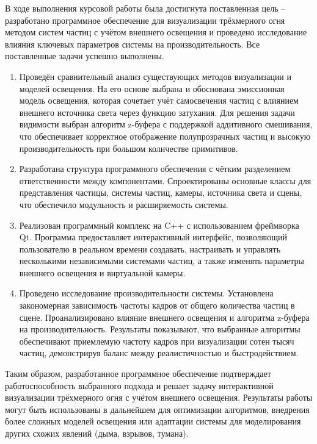 
В ходе выполнения курсовой работы была достигнута поставленная цель -- разработано программное обеспечение для визуализации трёхмерного огня методом систем частиц с учётом внешнего освещения и проведено исследование влияния ключевых параметров системы на производительность. Все поставленные задачи успешно выполнены.

\begin{enumerate}
	\item Проведён сравнительный анализ существующих методов визуализации и моделей освещения. На его основе выбрана и обоснована эмиссионная модель освещения, которая сочетает учёт самосвечения частиц с влиянием внешнего источника света через функцию затухания. Для решения задачи видимости выбран алгоритм z-буфера с поддержкой аддитивного смешивания, что обеспечивает корректное отображение полупрозрачных частиц и высокую производительность при большом количестве примитивов.
	
	\item Разработана структура программного обеспечения с чётким разделением ответственности между компонентами. Спроектированы основные классы для представления частицы, системы частиц, камеры, источника света и сцены, что обеспечило модульность и расширяемость системы.
	
	\item Реализован программный комплекс на C++ с использованием фреймворка Qt. Программа предоставляет интерактивный интерфейс, позволяющий пользователю в реальном времени создавать, настраивать и управлять несколькими независимыми системами частиц, а также изменять параметры внешнего освещения и виртуальной камеры.
	
	\item Проведено исследование производительности системы. Установлена закономерная зависимость частоты кадров от общего количества частиц в сцене. Проанализировано влияние внешнего освещения и алгоритма z-буфера на производительность. Результаты показывают, что выбранные алгоритмы обеспечивают приемлемую частоту кадров при визуализации сотен тысяч частиц, демонстрируя баланс между реалистичностью и быстродействием.
\end{enumerate}

Таким образом, разработанное программное обеспечение подтверждает работоспособность выбранного подхода и решает задачу интерактивной визуализации трёхмерного огня с учётом внешнего освещения. Результаты работы могут быть использованы в дальнейшем для оптимизации алгоритмов, внедрения более сложных моделей освещения или адаптации системы для моделирования других схожих явлений (дыма, взрывов, тумана).

\clearpage